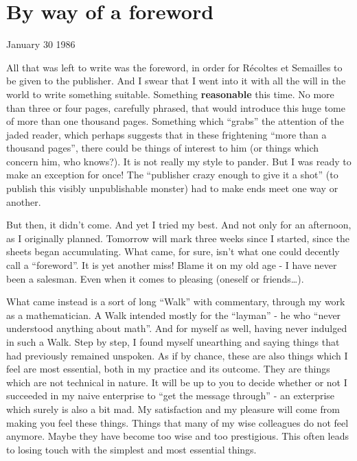 \begin{comment}
\documentclass{book}
\usepackage{master}
\newcommand{\rec}{$\text{R\'ecoltes et Semailles}$}
\newcommand{\no}{n$^\circ$}
\hfuzz = 100pt

\end{comment}

\chapter{By way of a foreword}
\label{chapter:1}

January 30 1986

All that was left to write was the foreword, in order for
R\'ecoltes et Semailles to be given to the publisher.
And I swear that I went into it with all the will in the world to write something suitable. 
Something \textbf{reasonable} this time. No more than three or four pages, carefully phrased, that would introduce this huge tome of more than one thousand
pages. Something which ``grabs'' the attention of the jaded reader, 
which perhaps suggests that in these frightening ``more than a thousand pages'', there
could be things of interest to him (or things which concern him, who knows?). It is not
really my style to pander. But I was ready to make an exception for once!
The ``publisher crazy enough to give it a shot'' (to publish this visibly unpublishable
monster) had to make ends meet one way or another. 

But then, it didn't come. And yet I tried my best. And not only for an afternoon, as I
originally planned. Tomorrow will mark three weeks since I started, since the sheets began
accumulating.
What came, for sure, isn't what one could decently call a ``foreword''.
It is yet another miss! Blame it on my old age - I have never been a salesman. Even when
it comes to pleasing (oneself or friends\ldots).

What came instead is a sort of long ``Walk'' with commentary, through my work as a mathematician. 
A Walk intended mostly for the ``layman'' - he who ``never understood anything about
math''. And for myself as well, having never indulged in such a Walk. 
Step by step, I found myself unearthing and saying things that had previously remained
unspoken. As if by chance, these are also things which I feel are most essential, both in
my practice and its outcome. 
They are things which are not technical in nature. It will be up to you to decide whether
or not I succeeded in my naive enterprise to ``get the message through'' - an exterprise
which surely is also a bit mad. 
My satisfaction and my pleasure will come from making you feel these things. 
Things that many of my wise colleagues do not feel anymore. Maybe they have become too wise
and too prestigious.
This often leads to losing touch with the simplest and most essential things. 

